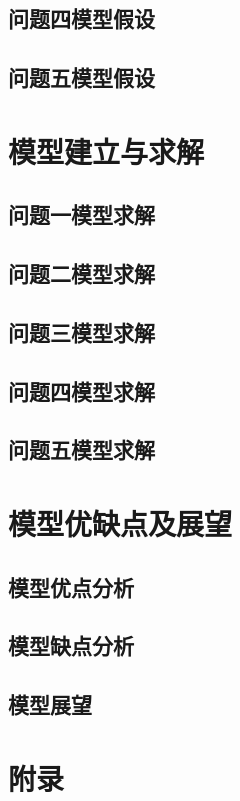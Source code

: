 \documentclass{article}
\begin{document}
\subsection{问题四模型假设}

\subsection{问题五模型假设}

\section{模型建立与求解}

\subsection{问题一模型求解}

\subsection{问题二模型求解}

\subsection{问题三模型求解}

\subsection{问题四模型求解}

\subsection{问题五模型求解}

\section{模型优缺点及展望}

\subsection{模型优点分析}

\subsection{模型缺点分析}

\subsection{模型展望}




\section*{附录}
\vspace{-1em}


\noindent
\end{document}
